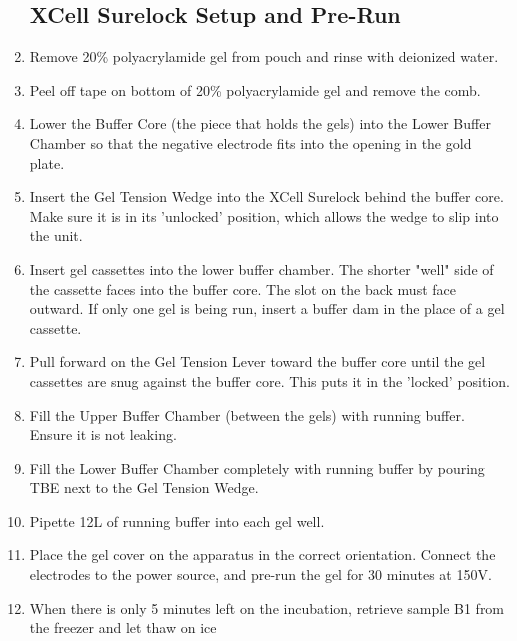 \documentclass[letterpaper]{article}
\newcommand{\uL}{\micro{}L}
\begin{document}
\begin{enumerate}
\subsection{XCell Surelock Setup and Pre-Run}
\item{Remove 20\% polyacrylamide gel from pouch and rinse with deionized water.}
\item{Peel off tape on bottom of 20\% polyacrylamide gel and remove the comb.}
\item{Lower the Buffer Core (the piece that holds the gels) into the Lower Buffer Chamber so that the negative electrode fits into the opening in the gold plate.}
\item{Insert the Gel Tension Wedge into the XCell Surelock behind the buffer core. Make sure it is in its 'unlocked' position, which allows the wedge to slip into the unit.}
\item{Insert gel cassettes into the lower buffer chamber. The shorter "well" side of the cassette faces into the buffer core. The slot on the back must face outward. If only one gel is being run, insert a buffer dam in the place of a gel cassette.}
\item{Pull forward on the Gel Tension Lever toward the buffer core until the gel cassettes are snug against the buffer core. This puts it in the 'locked' position.}
\item{Fill the Upper Buffer Chamber (between the gels) with running buffer. Ensure it is not leaking.}
\item{Fill the Lower Buffer Chamber completely with running buffer by pouring TBE next to the Gel Tension Wedge.}
\item{Pipette 12\uL{} of running buffer into each gel well.}
\item{Place the gel cover on the apparatus in the correct orientation. Connect the electrodes to the power source, and pre-run the gel for 30 minutes at 150V.}
\item{When there is only 5 minutes left on the incubation, retrieve sample B1 from the freezer and let thaw on ice}

\end{enumerate}
\end{document}
